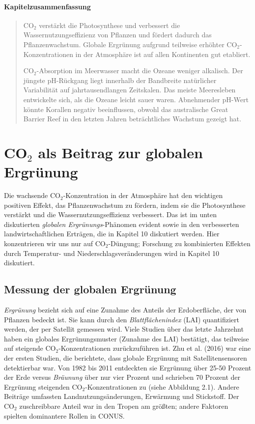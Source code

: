 \documentclass[12pt,paper=a4,DIV=12,parskip=never,chapterprefix=false,headings=standardclasses]{scrreprt}
\begin{document}
\paragraph{Kapitelzusammenfassung}
\begin{quote}
CO$_2$ verstärkt die Photosynthese und verbessert die Wassernutzungseffizienz von Pflanzen und fördert dadurch das Pflanzenwachstum. Globale Ergrünung aufgrund teilweise erhöhter CO$_2$-Konzentrationen in der Atmosphäre ist auf allen Kontinenten gut etabliert.

CO$_2$-Absorption im Meerwasser macht die Ozeane weniger alkalisch. Der jüngste pH-Rückgang liegt innerhalb der Bandbreite natürlicher Variabilität auf jahrtausendlangen Zeitskalen. Das meiste Meeresleben entwickelte sich, als die Ozeane leicht sauer waren. Abnehmender pH-Wert könnte Korallen negativ beeinflussen, obwohl das australische Great Barrier Reef in den letzten Jahren beträchtliches Wachstum gezeigt hat.
\end{quote}

\section{CO$_2$ als Beitrag zur globalen Ergrünung}

Die wachsende CO$_2$-Konzentration in der Atmosphäre hat den wichtigen positiven Effekt, das Pflanzenwachstum zu fördern, indem sie die Photosynthese verstärkt und die Wassernutzungseffizienz verbessert. Das ist im unten diskutierten \emph{globalen Ergrünungs}-Phänomen evident sowie in den verbesserten landwirtschaftlichen Erträgen, die in Kapitel 10 diskutiert werden. Hier konzentrieren wir uns nur auf CO$_2$-Düngung; Forschung zu kombinierten Effekten durch Temperatur- und Niederschlagsveränderungen wird in Kapitel 10 diskutiert.

\subsection{Messung der globalen Ergrünung}

\emph{Ergrünung} bezieht sich auf eine Zunahme des Anteils der Erdoberfläche, der von Pflanzen bedeckt ist. Sie kann durch den \emph{Blattflächenindex} (LAI) quantifiziert werden, der per Satellit gemessen wird. Viele Studien über das letzte Jahrzehnt haben ein globales Ergrünungsmuster (Zunahme des LAI) bestätigt, das teilweise auf steigende CO$_2$-Konzentrationen zurückzuführen ist. Zhu et al. (2016) war eine der ersten Studien, die berichtete, dass globale Ergrünung mit Satellitensensoren detektierbar war. Von 1982 bis 2011 entdeckten sie Ergrünung über 25-50 Prozent der Erde versus \emph{Bräunung} über nur vier Prozent und schrieben 70 Prozent der Ergrünung steigenden CO$_2$-Konzentrationen zu (siehe Abbildung 2.1). Andere Beiträge umfassten Landnutzungsänderungen, Erwärmung und Stickstoff. Der CO$_2$ zuschreibbare Anteil war in den Tropen am größten; andere Faktoren spielten dominantere Rollen in CONUS.
\end{document}
